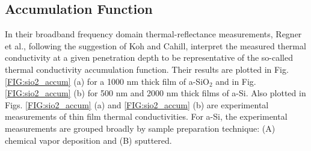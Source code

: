 \documentclass[aps,prb,onecolumn,preprint,superscriptaddress,footinbib,amsmath,amssymb,floatfix]{revtex4}
\begin{document}

\subsection{\label{S:Accumulation}Accumulation Function}

In their broadband frequency domain thermal-reflectance 
measurements, Regner et al.,\cite{regner_broadband_2013}  
following the suggestion of Koh and Cahill,\cite{koh_frequency_2007} 
interpret the  
measured thermal conductivity at a given penetration depth 
to be representative of the so-called thermal conductivity 
accumulation function.\cite{dames_thermal_2005,yang_mean_2013} 
Their results are plotted in Fig. \ref{FIG:sio2_accum} (a) 
for a 1000 nm thick film of a-SiO$_2$ 
and in Fig. \ref{FIG:sio2_accum} (b) for 500 nm and 
2000 nm thick films of a-Si. Also plotted in 
Figs. \ref{FIG:sio2_accum} (a) and \ref{FIG:sio2_accum} (b) 
are experimental measurements of thin film thermal 
conductivities. For a-Si, the experimental measurements are grouped 
broadly by sample preparation technique: 
(A) chemical vapor deposition
\cite{moon_thermal_2002,liu_high_2009,yang_anomalously_2010}
and (B) sputtered.
\cite{kuo_thermal_1992,cahill_thermal_1994,wada_thermal_1996}
\end{document}
